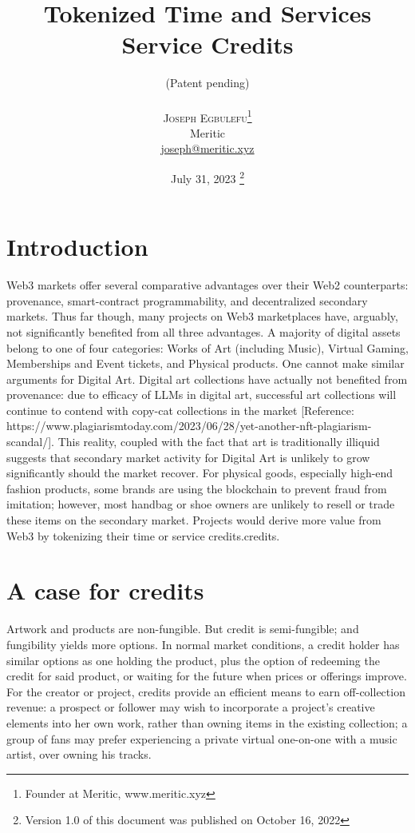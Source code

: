 \documentclass[twoside]{article}
\title{Tokenized Time and Services Service Credits} %
\author{%
\normalsize (Patent pending)\\ %
\\
\textsc{Joseph Egbulefu}\thanks{Founder at Meritic, www.meritic.xyz} \\[1ex] %
\normalsize Meritic\\ %
\normalsize \href{mailto:joseph@meritic.xyz}{joseph@meritic.xyz} %
}
\date{July 31, 2023  \footnote{Version 1.0 of this document was published on October 16, 2022}}
\begin{document}
\maketitle


\section{Introduction}
\indent 

Web3 markets offer  several comparative advantages over their Web2 counterparts: provenance, smart-contract programmability, and decentralized secondary markets. Thus far though, many projects on Web3 marketplaces have, arguably, not significantly benefited from all three advantages.  A majority of digital assets belong to one of four categories: Works of Art (including Music), Virtual Gaming, Memberships and Event tickets, and Physical products. 
One cannot make similar arguments for Digital Art. Digital art collections have actually not benefited from provenance: due to  efficacy of LLMs in digital art, successful art collections will continue to contend with copy-cat collections in the market [Reference: https://www.plagiarismtoday.com/2023/06/28/yet-another-nft-plagiarism-scandal/]. This reality, coupled with the fact that art is traditionally illiquid suggests that secondary market activity for Digital Art is unlikely to grow significantly should the market recover. For physical goods, especially high-end fashion products, some brands are using the  blockchain to prevent fraud from imitation; however, most handbag or shoe owners are unlikely to resell or trade these items on the secondary market. Projects would derive more value from Web3 by tokenizing their time or service credits.credits.

\section{A case for credits}
Artwork and products are non-fungible. But credit is semi-fungible; and fungibility yields more options. In normal market conditions,  a credit holder has similar options as one holding the product, plus the option of redeeming the credit for said product, or waiting for the future when prices or offerings improve. For the creator or project, credits provide an efficient means to earn off-collection revenue: a prospect or follower may wish to incorporate a project’s creative elements  into her own work, rather than owning items in the existing  collection; a group of fans may prefer experiencing a private virtual one-on-one with a music artist, over owning his  tracks. 
\end{document}

